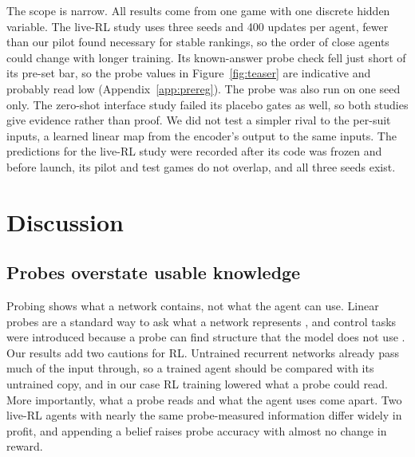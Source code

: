 \documentclass{article}
\begin{document}
The scope is narrow. All results come from one game with one discrete hidden variable. The live-RL study uses three seeds and 400 updates per agent, fewer than our pilot found necessary for stable rankings, so the order of close agents could change with longer training. Its known-answer probe check fell just short of its pre-set bar, so the probe values in Figure~\ref{fig:teaser} are indicative and probably read low (Appendix~\ref{app:prereg}). The probe was also run on one seed only. The zero-shot interface study failed its placebo gates as well, so both studies give evidence rather than proof. We did not test a simpler rival to the per-suit inputs, a learned linear map from the encoder's output to the same inputs. The predictions for the live-RL study were recorded after its code was frozen and before launch, its pilot and test games do not overlap, and all three seeds exist.

\section{Discussion}
\label{sec:discussion}

\subsection{Probes overstate usable knowledge}
Probing shows what a network contains, not what the agent can use. Linear probes are a standard way to ask what a network represents \cite{alain2016probes,belinkov2022probing}, and control tasks were introduced because a probe can find structure that the model does not use \cite{hewitt2019control}. Our results add two cautions for RL. Untrained recurrent networks already pass much of the input through, so a trained agent should be compared with its untrained copy, and in our case RL training lowered what a probe could read. More importantly, what a probe reads and what the agent uses come apart. Two live-RL agents with nearly the same probe-measured information differ widely in profit, and appending a belief raises probe accuracy with almost no change in reward.
\end{document}
